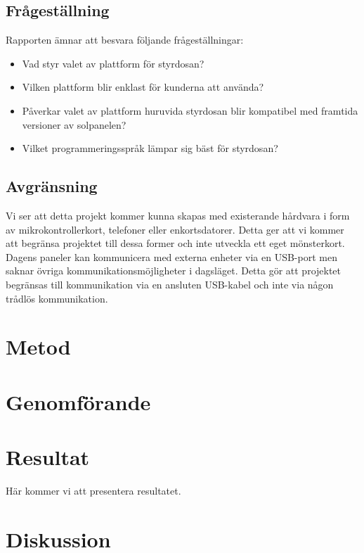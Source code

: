 \documentclass{article}
\begin{document}
		\subsection{Frågeställning} %
		\label{sub:fragestallning}
		Rapporten ämnar att besvara följande frågeställningar:\\
		\begin{itemize}
			\item Vad styr valet av plattform för styrdosan?
			\item Vilken plattform blir enklast för kunderna att använda?
			\item Påverkar valet av plattform huruvida styrdosan blir kompatibel med framtida versioner av solpanelen?
			\item Vilket programmeringsspråk lämpar sig bäst för styrdosan?
		\end{itemize}	
		


		\subsection{Avgränsning} %
		\label{sub:avgransning}
			Vi ser att detta projekt kommer kunna skapas med existerande hårdvara i form av mikrokontrollerkort, telefoner eller enkortsdatorer. Detta ger att vi kommer att begränsa projektet till dessa former och inte utveckla ett eget mönsterkort.\\

			\noindent Dagens paneler kan kommunicera med externa enheter via en USB-port men saknar övriga kommunikationsmöjligheter i dagsläget. Detta gör att projektet begränsas till kommunikation via en ansluten USB-kabel och inte via någon trådlös kommunikation.

	\section{Metod} %
	\label{sec:huvudtext}

	\section{Genomförande} %
	\label{sec:genomf_rande}
	

	\section{Resultat} %
	\label{sec:resultat}
	Här kommer vi att presentera resultatet. \\

	\section{Diskussion} %
	\label{sec:sammanfattning}


	\printbibliography		
\end{document}
